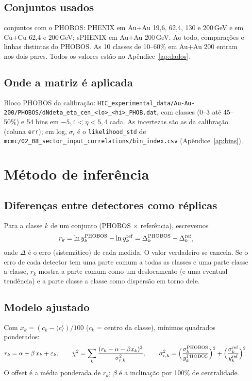 \documentclass[11pt,a4paper]{article}
\newcommand{\arq}[1]{\texttt{\nolinkurl{#1}}}
\begin{document}
\subsection{Conjuntos usados}
\valNsets{} conjuntos com o PHOBOS: PHENIX em Au+Au 19,6, 62,4, 130 e 200\,GeV e em Cu+Cu 62,4 e 200\,GeV; sPHENIX em
Au+Au 200\,GeV. Ao todo, \valNcmp{} comparações e \valNphobos{} linhas distintas do PHOBOS. As 10 classes de 10--60\% em
Au+Au 200 entram nos dois pares. Todos os valores estão no Apêndice~\ref{ap:dados}.

\subsection{Onde a matriz é aplicada}
Bloco PHOBOS da calibração: \arq{HIC_experimental_data/Au-Au-200/PHOBOS/dNdeta_eta_cen_<lo>_<hi>_PHOB.dat}, com
\valNclasses{} classes (0--3 até 45--50\%) e 54 bins em $-5{,}4<\eta<5{,}4$ cada. As incertezas são as da calibração (coluna
\texttt{err}); em log, $\sigma_i$ é o \texttt{likelihood\_std} de \arq{mcmc/02_08_sector_input_correlations/bin_index.csv}
(Apêndice~\ref{ap:bins}).

\section{Método de inferência}\label{sec:metodo}
\subsection{Diferenças entre detectores como réplicas}
Para a classe $k$ de um conjunto (PHOBOS $\times$ referência), escrevemos
\begin{equation}
r_k=\ln y^{\rm PHOBOS}_k-\ln y^{\rm ref}_k = \Delta_k^{\rm PHOBOS}-\Delta_k^{\rm ref},
\end{equation}
onde $\Delta$ é o erro (sistemático) de cada medida. O valor verdadeiro se cancela. Se o erro de cada detector tem uma
parte comum a todas as classes e uma parte classe a classe, $r_k$ mostra a parte comum como um deslocamento (e uma
eventual tendência) e a parte classe a classe como dispersão em torno dele.

\subsection{Modelo ajustado}
Com $x_k=(c_k-\langle c\rangle)/100$ ($c_k$ = centro da classe), mínimos quadrados ponderados:
\begin{equation}
r_k=\alpha+\beta\,x_k+\varepsilon_k,\qquad \chi^2=\sum_k \frac{(r_k-\alpha-\beta x_k)^2}{\sigma_{r,k}^2},\qquad
\sigma_{r,k}^2=\Big(\frac{\sigma^{\rm PHOBOS}_k}{y^{\rm PHOBOS}_k}\Big)^2+\Big(\frac{\sigma^{\rm ref}_k}{y^{\rm ref}_k}\Big)^2 .
\end{equation}
O offset é a média ponderada de $r_k$; $\beta$ é a inclinação por 100\% de centralidade.
\end{document}
